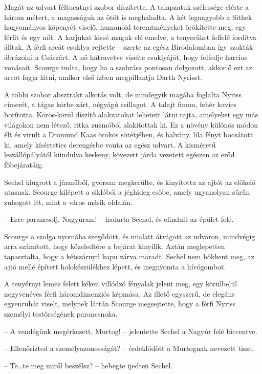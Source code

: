 \documentclass{thesis-ekf}
\theoremstyle{definition}
\begin{document}
Magát az udvart féltucatnyi szobor díszítette. A talapzatuk szélessége elérte a három métert,
a magasságuk az ötöt is meghaladta. A két legnagyobb a Sithek hagyományos köpenyét
viselő, humanoid teremtményeket örökítette meg, egy férfit és egy nőt. A karjukat kissé maguk
elé emelve, a tenyerüket felfelé fordítva álltak. A férfi arcát csuklya rejtette -- szerte az egész
Birodalomban így szokták ábrázolni a Császárt. A nő hátravetve viselte csuklyáját, hogy
felfedje harcias vonásait. Scourge tudta, hogy ha a szobrász pontosan dolgozott, akkor ő ezt az
arcot fogja látni, amikor első ízben megpillantja Darth Nyrisst.

A többi szobor absztrakt alkotás volt, de mindegyik magába foglalta Nyriss címerét, a tágas
körbe zárt, négyágú csillagot. A talajt finom, fehér kavics borította. Körös-körül díszítő
alakzatokat lehetett látni rajta, amelyeket egy más világokon nem létező, ritka zuzmóból
alakítottak ki. Ez a növény különös módon élt és virult a Dromund Kaas örökös sötétjében, és
halvány, lila fényt bocsátott ki, amely kísérteties derengésbe vonta az egész udvart. A
kisméretű leszállópályától kiindulva keskeny, kövezett járda vezetett egészen az erőd
főbejáratáig.

Sechel kiugrott a járműből, gyorsan megkerülte, és kinyitotta az ajtót az előkelő utasnak.
Scourge kilépett a siklóból a jéghideg esőbe, amely ugyanolyan sűrűn zuhogott itt, mint a város
másik oldalán.

-- Erre parancsolj, Nagyuram! -- hadarta Sechel, és elindult az épület felé.

Scourge a szolga nyomába szegődött, és mialatt átvágott az udvaron, mindvégig arra
számított, hogy közeledtére a bejárat kinyílik. Aztán meglepetten tapasztalta, hogy a
kétszárnyú kapu zárva maradt. Sechel nem hökkent meg, az ajtó mellé épített holokészülékhez
lépett, és megnyomta a hívógombot.

A tenyérnyi lemez felett kéken villódzó fényalak jelent meg, egy körülbelül negyvenéves férfi
háromdimenziós képmása. Az illető egyszerű, de elegáns egyenruhát viselt, melynek láttán
Scourge megsejtette, hogy a férfi Nyriss személyi testőrségének parancsnoka.

-- A vendégünk megérkezett, Murtog! -- jelentette Sechel a Nagyúr felé biccentve.

-- Ellenőrizted a személyazonosságát? -- érdeklődött a Murtognak nevezett tiszt.

-- Te\dots te meg miről beszélsz? -- hebegte ijedten Sechel.
\end{document}
